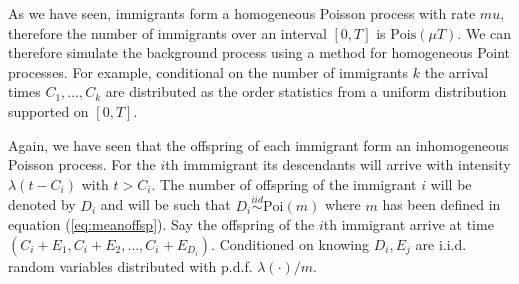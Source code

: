 \documentclass[11pt,a4paper]{article}
\begin{document}
As we have seen, immigrants form a homogeneous Poisson process with rate $mu$, therefore the number of immigrants over an interval $[0, T]$ is $\text{Pois}(\mu T)$. We can therefore simulate the background process using a method for homogeneous Point processes. For example, conditional on the number of immigrants $k$ the arrival times $C_1, \dots, C_k$ are distributed as the order statistics from a uniform distribution supported on $[0, T]$.

Again, we have seen that the offspring of each immigrant form an inhomogeneous Poisson process. For the $i$th immmigrant its descendants will arrive with intensity $\lambda(t-C_i)$ with $t > C_i$. The number of offspring of the immigrant $i$ will be denoted by $D_i$ and will be such that $D_i \overset{iid}{\sim}\text{Poi}(m)$ where $m$ has been defined in equation (\ref{eq:meanoffsp}). Say the offspring of the $i$th immigrant arrive at time $(C_i + E_1, C_i + E_2, \dots, C_i + E_{D_i})$. Conditioned on knowing $D_i, E_j$ are i.i.d. random variables distributed with p.d.f. $\lambda(\cdot)/m$.
\end{document}
